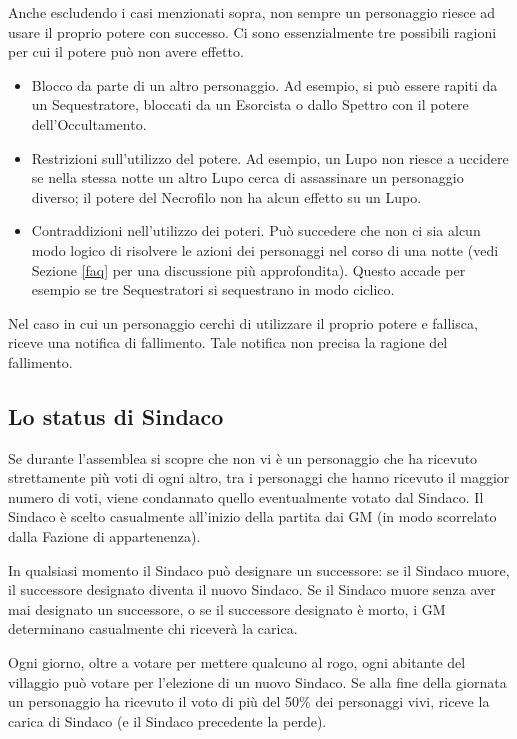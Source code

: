 \documentclass[a4paper,10pt]{article}
\begin{document}
Anche escludendo i casi menzionati sopra, non sempre un personaggio riesce ad usare il proprio potere con successo.
Ci sono essenzialmente tre possibili ragioni per cui il potere può non avere effetto.
\begin{itemize}
 \item Blocco da parte di un altro personaggio. Ad esempio, si può essere rapiti da un Sequestratore, bloccati da un Esorcista o dallo Spettro con il potere dell'Occultamento.
 \item Restrizioni sull'utilizzo del potere. Ad esempio, un Lupo non riesce a uccidere se nella stessa notte un altro Lupo cerca di assassinare un personaggio diverso; il potere del Necrofilo non ha alcun effetto su un Lupo.
 \item Contraddizioni nell'utilizzo dei poteri. Può succedere che non ci sia alcun modo logico di risolvere le azioni dei personaggi nel corso di una notte (vedi Sezione \ref{faq} per una discussione più approfondita). Questo accade per esempio se tre Sequestratori si sequestrano in modo ciclico.
\end{itemize}

Nel caso in cui un personaggio cerchi di utilizzare il proprio potere e fallisca, riceve una notifica di fallimento. Tale notifica non precisa la ragione del fallimento.


\subsection{Lo status di Sindaco}
\label{sindaco}

Se durante l'assemblea si scopre che non vi è un personaggio che ha ricevuto strettamente più voti di ogni altro, tra i personaggi che hanno ricevuto il maggior numero di voti, viene condannato quello eventualmente votato dal Sindaco.
Il Sindaco è scelto casualmente all'inizio della partita dai GM (in modo scorrelato dalla Fazione di appartenenza).

In qualsiasi momento il Sindaco può designare un successore: se il Sindaco muore, il successore designato diventa il nuovo Sindaco. Se il Sindaco muore senza aver mai designato un successore, o se il successore designato è morto, i GM determinano casualmente chi riceverà la carica.

Ogni giorno, oltre a votare per mettere qualcuno al rogo, ogni abitante del villaggio può votare per l'elezione di un nuovo Sindaco. Se alla fine della giornata un personaggio ha ricevuto il voto di più del 50\% dei personaggi vivi, riceve la carica di Sindaco (e il Sindaco precedente la perde).
\end{document}
